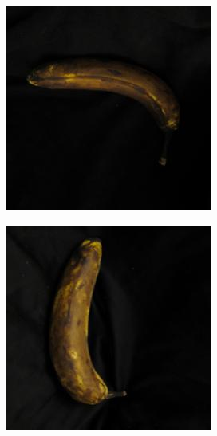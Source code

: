 \documentclass{article} %
\begin{document}
\begin{figure}[h]
\begin{subfigure}{.123\textwidth}
\captionsetup{labelformat=empty}
\caption{}
\end{subfigure}%
  \begin{subfigure}{.123\textwidth}
  \centering
\includegraphics[width=\textwidth]{../results/q_samples/mis_other/ROTTEN_3_OTHER_3.jpg}
\captionsetup{labelformat=empty}
\caption{}
\end{subfigure}%
  \begin{subfigure}{.123\textwidth}
  \centering
\includegraphics[width=\textwidth]{../results/q_samples/mis_other/ROTTEN_3_OTHER_6.jpg}

\end{subfigure}
\end{figure}
\end{document}
